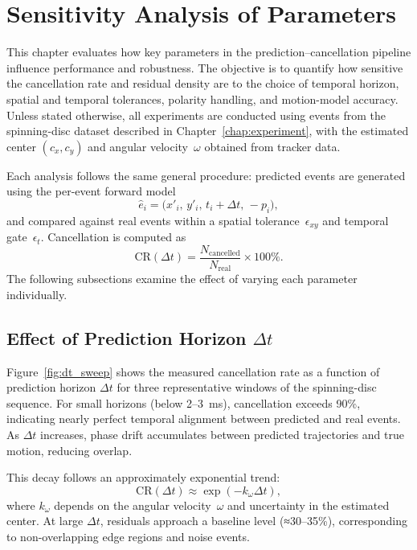\chapter{Sensitivity Analysis of Parameters}
\label{chap:metrics}

This chapter evaluates how key parameters in the prediction–cancellation pipeline influence performance and robustness. 
The objective is to quantify how sensitive the cancellation rate and residual density are to the choice of temporal horizon, spatial and temporal tolerances, polarity handling, and motion-model accuracy.
Unless stated otherwise, all experiments are conducted using events from the spinning-disc dataset described in Chapter~\ref{chap:experiment}, with the estimated center \((c_x, c_y)\) and angular velocity~\(\omega\) obtained from tracker data.

Each analysis follows the same general procedure: predicted events are generated using the per-event forward model
\[
\hat{e}_i = \big(x'_i,\, y'_i,\, t_i + \Delta t,\, -p_i \big),
\]
and compared against real events within a spatial tolerance~\(\epsilon_{xy}\) and temporal gate~\(\epsilon_t\). 
Cancellation is computed as
\[
\text{CR}(\Delta t) = \frac{N_{\text{cancelled}}}{N_{\text{real}}} \times 100\%.
\]
The following subsections examine the effect of varying each parameter individually.

\section{Effect of Prediction Horizon \(\Delta t\)}
\label{sec:dt_sensitivity}

Figure~\ref{fig:dt_sweep} shows the measured cancellation rate as a function of prediction horizon \(\Delta t\) for three representative windows of the spinning-disc sequence. 
For small horizons (below 2–3~ms), cancellation exceeds 90\%, indicating nearly perfect temporal alignment between predicted and real events.
As \(\Delta t\) increases, phase drift accumulates between predicted trajectories and true motion, reducing overlap.

This decay follows an approximately exponential trend:
\[
\text{CR}(\Delta t) \approx \exp\!\left(-k_{\omega}\Delta t\right),
\]
where \(k_{\omega}\) depends on the angular velocity~\(\omega\) and uncertainty in the estimated center.
At large \(\Delta t\), residuals approach a baseline level (≈30–35\%), corresponding to non-overlapping edge regions and noise events.

